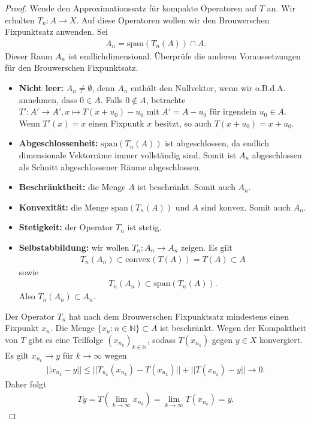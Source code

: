 \documentclass[a4paper]{article}
\theoremstyle{definition}
\begin{document}
\begin{proof}
    Wende den Approximationssatz für kompakte Operatoren auf $T$ an. Wir erhalten $T_n: A \to X$. Auf diese Operatoren wollen wir den Brouwerschen Fixpunktsatz anwenden. Sei 
    \begin{align*}
        A_n = \mathrm{span}(T_n(A)) \cap A.
    \end{align*}
    Dieser Raum $A_n$ ist endlichdimensional. Überprüfe die anderen Voraussetzungen für den Brouwerschen Fixpunktsatz.

    \begin{itemize}
        \item \textbf{Nicht leer:} $A_n \neq \emptyset$, denn $A_n$ enthält den Nullvektor, wenn wir o.B.d.A. annehmen, dass $0 \in A$. Falls $0 \notin A$, betrachte $T': A' \to A', x \mapsto T(x + u_0) - u_0$ mit $A' = A - u_0$ für irgendein $u_0 \in A$. Wenn $T'(x) = x$ einen Fixpuntk $x$ besitzt, so auch $T(x+u_0) = x+u_0$.
        \item \textbf{Abgeschlossenheit:} $\mathrm{span}(T_n(A))$ ist abgeschlossen, da endlich dimensionale Vektorräme immer vollständig sind. Somit ist $A_n$ abgeschlossen als Schnitt abgeschlossener Räume abgeschlossen.
        \item \textbf{Beschränktheit:} die Menge $A$ ist beschränkt. Somit auch $A_n$.
        \item \textbf{Konvexität:} die Menge $\mathrm{span}(T_n(A))$ und $A$ sind konvex. Somit auch $A_n$.
        \item \textbf{Stetigkeit:} der Operator $T_n$ ist stetig.
        \item \textbf{Selbstabbildung:} wir wollen $T_n: A_n \to A_n$ zeigen. Es gilt
        \begin{align*}
            T_n(A_n) \subset \mathrm{convex}(T(A)) = T(A) \subset A
        \end{align*}
        sowie 
        \begin{align*}
            T_n(A_n) \subset \mathrm{span}(T_n(A)).
        \end{align*}
        Also $T_n(A_n) \subset A_n$.
    \end{itemize}
    Der Operator $T_n$ hat nach dem Brouwerschen Fixpunktsatz mindestens einen Fixpunkt $x_n$. Die Menge $\{ x_n : n \in \mathbb{N} \} \subset A$ ist beschränkt. Wegen der Kompaktheit von $T$ gibt es eine Teilfolge $(x_{n_k})_{k \in \mathbb{N}}$, sodass $T(x_{n_k})$ gegen $y \in X$ konvergiert. Es gilt $x_{n_k} \to y$ für $k \to \infty$ wegen
    \begin{align*}
        ||x_{n_k} - y|| \leq ||T_{n_k}(x_{n_k}) - T(x_{n_k})|| + ||T(x_{n_k}) - y|| \to 0.
    \end{align*}
    Daher folgt 
    \begin{align*}
        Ty =  T(\lim_{k \to \infty} x_{n_k}) = \lim_{k \to \infty} T(x_{n_k}) = y.
    \end{align*}
\end{proof}
\end{document}
